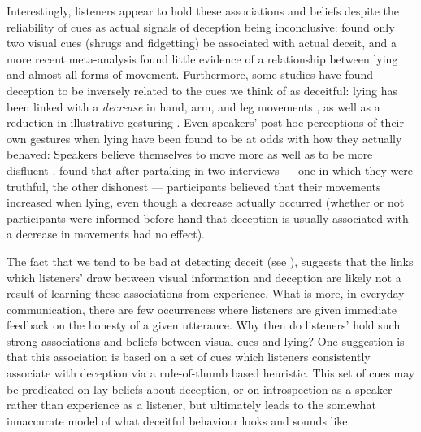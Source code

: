 \documentclass[a4paper,man,natbib]{apa6}
\begin{document}
Interestingly, listeners appear to hold these associations and beliefs despite the reliability of cues as actual signals of deception being inconclusive: \citet{Zuckerman1981} found only two visual cues (shrugs and fidgetting) be associated with actual deceit, and a more recent meta-analysis \citet{DePaulo2003} found little evidence of a relationship between lying and almost all forms of movement.
Furthermore, some studies have found deception to be inversely related to the cues we think of as deceitful: lying has been linked with a \emph{decrease} in hand, arm, and leg movements \citep[e.g.][]{DePaulo1992, Ekman1989, Vrij1995}, as well as a reduction in illustrative gesturing \citep[e.g.][]{DePaulo2003, Cohen2010}.
Even speakers' post-hoc perceptions of their own gestures when lying have been found to be at odds with how they actually behaved:
Speakers believe themselves to move more \citep{Vrij1996} as well as to be more disfluent \citep{Zuckerman1981a}.
\citet{Vrij1996} found that after partaking in two interviews --- one in which they were truthful, the other dishonest --- participants believed that their movements increased when lying, even though a decrease actually occurred (whether or not participants were informed before-hand that deception is usually associated with a decrease in movements had no effect).

The fact that we tend to be bad at detecting deceit (see \citet{Vrij2000}), suggests that the links which listeners' draw between visual information and deception are likely not a result of learning these associations from experience.
What is more, in everyday communication, there are few occurrences where listeners are given immediate feedback on the honesty of a given utterance.
Why then do listeners' hold such strong associations and beliefs between visual cues and lying?
One suggestion \citep{DePaulo1982} is that this association is based on a set of cues which listeners consistently associate with deception via a rule-of-thumb based heuristic.
This set of cues may be predicated on lay beliefs about deception, or on introspection as a speaker rather than experience as a listener, but ultimately leads to the somewhat innaccurate model of what deceitful behaviour looks and sounds like. 
\end{document}
